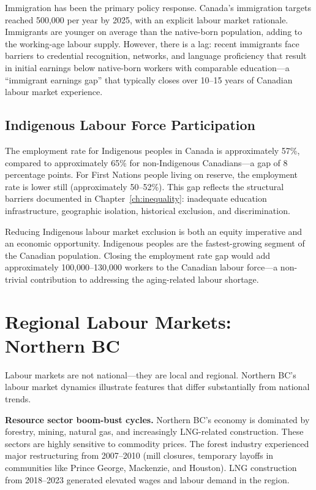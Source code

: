 Immigration has been the primary policy response. Canada's immigration targets reached 500,000 per year by 2025, with an explicit labour market rationale. Immigrants are younger on average than the native-born population, adding to the working-age labour supply. However, there is a lag: recent immigrants face barriers to credential recognition, networks, and language proficiency that result in initial earnings below native-born workers with comparable education---a ``immigrant earnings gap'' that typically closes over 10--15 years of Canadian labour market experience.

\subsection{Indigenous Labour Force Participation}

The employment rate for Indigenous peoples in Canada is approximately 57\%, compared to approximately 65\% for non-Indigenous Canadians---a gap of 8 percentage points. For First Nations people living on reserve, the employment rate is lower still (approximately 50--52\%). This gap reflects the structural barriers documented in Chapter~\ref{ch:inequality}: inadequate education infrastructure, geographic isolation, historical exclusion, and discrimination.

Reducing Indigenous labour market exclusion is both an equity imperative and an economic opportunity. Indigenous peoples are the fastest-growing segment of the Canadian population. Closing the employment rate gap would add approximately 100,000--130,000 workers to the Canadian labour force---a non-trivial contribution to addressing the aging-related labour shortage.

\section{Regional Labour Markets: Northern BC}

Labour markets are not national---they are local and regional. Northern BC's labour market dynamics illustrate features that differ substantially from national trends.

\textbf{Resource sector boom-bust cycles.} Northern BC's economy is dominated by forestry, mining, natural gas, and increasingly LNG-related construction. These sectors are highly sensitive to commodity prices. The forest industry experienced major restructuring from 2007--2010 (mill closures, temporary layoffs in communities like Prince George, Mackenzie, and Houston). LNG construction from 2018--2023 generated elevated wages and labour demand in the region.

